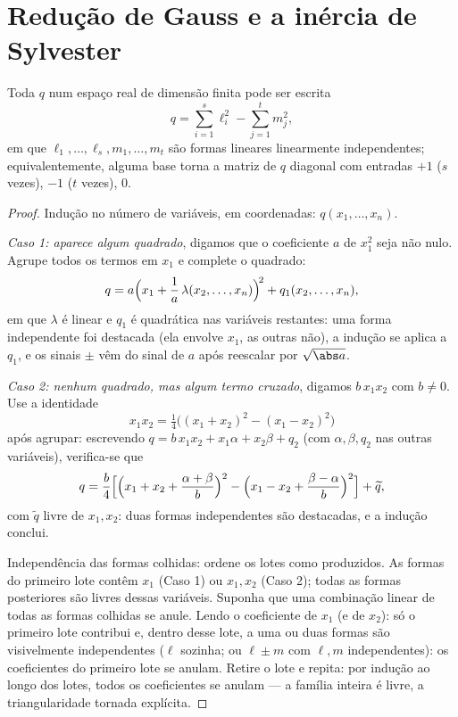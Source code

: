 \section{Redução de Gauss e a inércia de Sylvester}

\begin{theorem}\label{thm:b2:quadratic:gauss}
Toda  $q$ num espaço real de dimensão finita pode ser
escrita
\[
q = \sum_{i=1}^{s} \ell_i^2 - \sum_{j=1}^{t} m_j^2 ,
\]
em que $\ell_1, \dots, \ell_s, m_1, \dots, m_t$ são formas lineares
linearmente independentes; equivalentemente, alguma base torna a
matriz de $q$ diagonal com entradas $+1$ ($s$ vezes), $-1$ ($t$
vezes), $0$.
\end{theorem}

\begin{proof}
Indução no número de variáveis, em coordenadas: $q(x_1,
\dots, x_n)$.

\emph{Caso 1: aparece algum quadrado}, digamos que o coeficiente $a$ de
$x_1^2$ seja não nulo. Agrupe todos os termos em $x_1$ e complete o
quadrado:
\[
q = a\Bigl(x_1 + \frac{1}{a}\,\lambda(x_2, \dots,
x_n)\Bigr)^{\!2} + q_1(x_2, \dots, x_n),
\]
em que $\lambda$ é linear e $q_1$ é quadrática nas variáveis restantes:
uma forma independente foi destacada (ela envolve $x_1$, as
outras não), a indução se aplica a $q_1$, e os sinais $\pm$ vêm
do sinal de $a$ após reescalar por $\sqrt{\abs a}$.

\emph{Caso 2: nenhum quadrado, mas algum termo cruzado}, digamos $b\,x_1x_2$ com
$b \neq 0$. Use a identidade
\[
x_1x_2 = \tfrac14\bigl((x_1 + x_2)^2 - (x_1 - x_2)^2\bigr)
\]
após agrupar: escrevendo $q = b\,x_1x_2 + x_1\alpha + x_2\beta +
q_2$ (com $\alpha, \beta, q_2$ nas outras variáveis), verifica-se que
\[
q = \frac{b}{4}\Bigl[\Bigl(x_1 + x_2 + \frac{\alpha +
\beta}{b}\Bigr)^{2} - \Bigl(x_1 - x_2 + \frac{\beta -
\alpha}{b}\Bigr)^{2}\Bigr] + \widetilde q ,
\]
com $\widetilde q$ livre de $x_1, x_2$: duas formas independentes são
destacadas, e a indução conclui.

Independência das formas colhidas: ordene os lotes como
produzidos. As formas do primeiro lote contêm $x_1$ (Caso 1)
ou $x_1, x_2$ (Caso 2); todas as formas posteriores são livres dessas
variáveis. Suponha que uma combinação linear de todas as formas colhidas
se anule. Lendo o coeficiente de $x_1$ (e de $x_2$): só
o primeiro lote contribui e, dentro desse lote, a uma ou
duas formas são visivelmente independentes ($\ell$ sozinha; ou $\ell \pm
m$ com $\ell, m$ independentes): os coeficientes do primeiro lote
se anulam. Retire o lote e repita: por indução ao longo dos
lotes, todos os coeficientes se anulam --- a família inteira é livre,
a triangularidade tornada explícita.
\end{proof}

